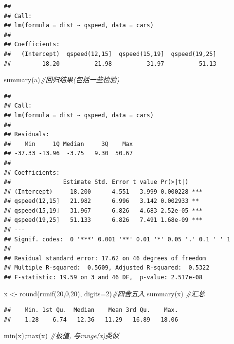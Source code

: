 \documentclass[
]{book}
\newenvironment{Shaded}{\begin{snugshade}}{\end{snugshade}}
\newcommand{\AttributeTok}[1]{\textcolor[rgb]{0.77,0.63,0.00}{#1}}
\newcommand{\CommentTok}[1]{\textcolor[rgb]{0.56,0.35,0.01}{\textit{#1}}}
\newcommand{\DecValTok}[1]{\textcolor[rgb]{0.00,0.00,0.81}{#1}}
\newcommand{\FunctionTok}[1]{\textcolor[rgb]{0.00,0.00,0.00}{#1}}
\newcommand{\NormalTok}[1]{#1}
\newcommand{\OtherTok}[1]{\textcolor[rgb]{0.56,0.35,0.01}{#1}}
\begin{document}
\begin{verbatim}
## 
## Call:
## lm(formula = dist ~ qspeed, data = cars)
## 
## Coefficients:
##   (Intercept)  qspeed(12,15]  qspeed(15,19]  qspeed(19,25]  
##         18.20          21.98          31.97          51.13
\end{verbatim}

\begin{Shaded}
\begin{Highlighting}[]
\FunctionTok{summary}\NormalTok{(a)}\CommentTok{\#回归结果(包括一些检验)}
\end{Highlighting}
\end{Shaded}

\begin{verbatim}
## 
## Call:
## lm(formula = dist ~ qspeed, data = cars)
## 
## Residuals:
##    Min     1Q Median     3Q    Max 
## -37.33 -13.96  -3.75   9.30  50.67 
## 
## Coefficients:
##               Estimate Std. Error t value Pr(>|t|)    
## (Intercept)     18.200      4.551   3.999 0.000228 ***
## qspeed(12,15]   21.982      6.996   3.142 0.002933 ** 
## qspeed(15,19]   31.967      6.826   4.683 2.52e-05 ***
## qspeed(19,25]   51.133      6.826   7.491 1.68e-09 ***
## ---
## Signif. codes:  0 '***' 0.001 '**' 0.01 '*' 0.05 '.' 0.1 ' ' 1
## 
## Residual standard error: 17.62 on 46 degrees of freedom
## Multiple R-squared:  0.5609, Adjusted R-squared:  0.5322 
## F-statistic: 19.59 on 3 and 46 DF,  p-value: 2.517e-08
\end{verbatim}

\begin{Shaded}
\begin{Highlighting}[]
\NormalTok{x }\OtherTok{\textless{}{-}} \FunctionTok{round}\NormalTok{(}\FunctionTok{runif}\NormalTok{(}\DecValTok{20}\NormalTok{,}\DecValTok{0}\NormalTok{,}\DecValTok{20}\NormalTok{), }\AttributeTok{digits=}\DecValTok{2}\NormalTok{)}\CommentTok{\#四舍五入}
\FunctionTok{summary}\NormalTok{(x) }\CommentTok{\#汇总}
\end{Highlighting}
\end{Shaded}

\begin{verbatim}
##    Min. 1st Qu.  Median    Mean 3rd Qu.    Max. 
##    1.28    6.74   12.36   11.29   16.89   18.06
\end{verbatim}

\begin{Shaded}
\begin{Highlighting}[]
\FunctionTok{min}\NormalTok{(x);}\FunctionTok{max}\NormalTok{(x) }\CommentTok{\#极值, 与range(x)类似}
\end{Highlighting}
\end{Shaded}
\end{document}
